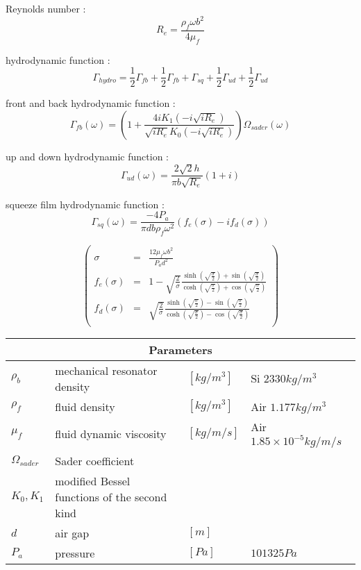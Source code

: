 \documentclass[12pt]{article}
\begin{document}
Reynolds number :
$$R_e=\frac{\rho_f \omega b^2}{4\mu_f}$$


hydrodynamic function :
$$ \Gamma_{hydro}=\frac{1}{2} \Gamma_{fb}+\frac{1}{2} \Gamma_{fb}+\Gamma_{sq}+\frac{1}{2} \Gamma_{ud}+\frac{1}{2} \Gamma_{ud}$$

front and back hydrodynamic function :
$$ \Gamma_{fb}(\omega)=  \left(1+ \frac{4iK_1(-i\sqrt{iR_e})}{\sqrt{iR_e}K_0(-i\sqrt{iR_e})}  \right)\Omega_{sader}(\omega) $$

up and down hydrodynamic function :
$$ \Gamma_{ud}(\omega) = \frac{2\sqrt{2}h}{\pi b \sqrt{R_e}}(1+i)$$

squeeze film hydrodynamic function :
$$ \Gamma_{sq}(\omega) = \frac{-4P_a}{\pi d b \rho_f \omega^2} (f_e(\sigma)-if_d(\sigma))$$

$$
\left(
\begin{array}{ccl}
\sigma & = & \frac{12\mu_f\omega b^2}{P_a d^2}  \\
f_e(\sigma) & = & 1 - \sqrt{\frac{2}{\sigma}}\frac{\sinh \left( \sqrt{\frac{\sigma}{2}} \right) + \sin \left( \sqrt{\frac{\sigma}{2}} \right)}{\cosh \left( \sqrt{\frac{\sigma}{2}} \right) + \cos \left( \sqrt{\frac{\sigma}{2}} \right)}\\
f_d(\sigma) & = &  \sqrt{\frac{2}{\sigma}}\frac{\sinh \left( \sqrt{\frac{\sigma}{2}} \right) - \sin \left( \sqrt{\frac{\sigma}{2}} \right)}{\cosh \left( \sqrt{\frac{\sigma}{2}} \right) - \cos \left( \sqrt{\frac{\sigma}{2}} \right)}\\
\end{array}
\right)
$$ 


\begin{tabular}{|p{1.5cm}||p{6cm}|p{1.5cm}|p{4cm}| }
  \hline
  \multicolumn{4}{|c|}{Parameters} \\
  \hline
  $\rho_b$ & mechanical resonator density & $[kg/m^{3}]$&Si $2330 kg/m^3$\\
  $\rho_f$ & fluid density & $[kg/m^{3}]$& Air $1.177 kg/m^3$\\
  $ \mu_f$ & fluid dynamic viscosity & $[kg/m/s]$&Air $1.85 \times 10^{-5} kg/m/s$\\
  $ \Omega_{sader}$ & Sader coefficient &  & \\
  $ K_0,K_1$ & modified Bessel functions of the second kind & & \\
  $ d $ & air gap & $[m]$ & \\
   $ P_a $ & pressure & $[Pa]$ & $101325 Pa$ \\
  \hline
\end{tabular}

 
\end{document}

